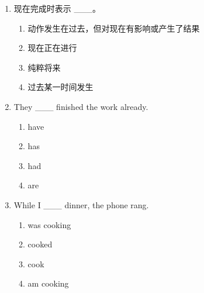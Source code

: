 \documentclass[11pt,a4paper]{ctexart}
\begin{document}
\begin{enumerate}[leftmargin=*,itemsep=4pt]
\begin{enumerate}[label=\Alph*.,leftmargin=2em,itemsep=1pt,topsep=2pt]
\item 过去经常发生
\end{enumerate}
\item 现在完成时表示 \_\_\_。
\begin{enumerate}[label=\Alph*.,leftmargin=2em,itemsep=1pt,topsep=2pt]
\item 动作发生在过去，但对现在有影响或产生了结果
\item 现在正在进行
\item 纯粹将来
\item 过去某一时间发生
\end{enumerate}
\item They \_\_\_ finished the work already.
\begin{enumerate}[label=\Alph*.,leftmargin=2em,itemsep=1pt,topsep=2pt]
\item have
\item has
\item had
\item are
\end{enumerate}
\item While I \_\_\_ dinner, the phone rang.
\begin{enumerate}[label=\Alph*.,leftmargin=2em,itemsep=1pt,topsep=2pt]
\item was cooking
\item cooked
\item cook
\item am cooking
\end{enumerate}
\end{enumerate}
\end{document}
